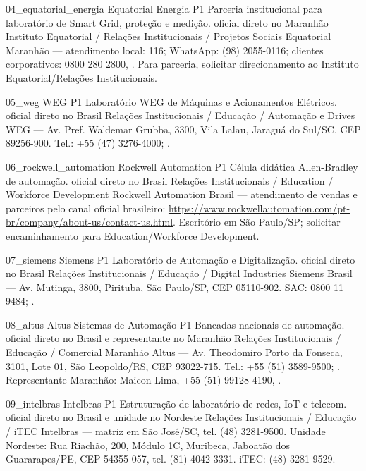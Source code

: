 \ContatoEmpresa
  {04_equatorial_energia}
  {Equatorial Energia}
  {P1}
  {Parceria institucional para laboratório de Smart Grid, proteção e medição.}
  {oficial direto no Maranhão}
  {Instituto Equatorial / Relações Institucionais / Projetos Sociais}
  {Equatorial Maranhão — atendimento local: 116; WhatsApp: (98) 2055-0116; clientes corporativos: 0800 280 2800, . Para parceria, solicitar direcionamento ao Instituto Equatorial/Relações Institucionais.}

\ContatoEmpresa
  {05_weg}
  {WEG}
  {P1}
  {Laboratório WEG de Máquinas e Acionamentos Elétricos.}
  {oficial direto no Brasil}
  {Relações Institucionais / Educação / Automação e Drives}
  {WEG — Av. Pref. Waldemar Grubba, 3300, Vila Lalau, Jaraguá do Sul/SC, CEP 89256-900. Tel.: +55 (47) 3276-4000; .}

\ContatoEmpresa
  {06_rockwell_automation}
  {Rockwell Automation}
  {P1}
  {Célula didática Allen-Bradley de automação.}
  {oficial direto no Brasil}
  {Relações Institucionais / Education / Workforce Development}
  {Rockwell Automation Brasil — atendimento de vendas e parceiros pelo canal oficial brasileiro: \url{https://www.rockwellautomation.com/pt-br/company/about-us/contact-us.html}. Escritório em São Paulo/SP; solicitar encaminhamento para Education/Workforce Development.}

\ContatoEmpresa
  {07_siemens}
  {Siemens}
  {P1}
  {Laboratório de Automação e Digitalização.}
  {oficial direto no Brasil}
  {Relações Institucionais / Educação / Digital Industries}
  {Siemens Brasil — Av. Mutinga, 3800, Pirituba, São Paulo/SP, CEP 05110-902. SAC: 0800 11 9484; .}

\ContatoEmpresa
  {08_altus}
  {Altus Sistemas de Automação}
  {P1}
  {Bancadas nacionais de automação.}
  {oficial direto no Brasil e representante no Maranhão}
  {Relações Institucionais / Educação / Comercial Maranhão}
  {Altus — Av. Theodomiro Porto da Fonseca, 3101, Lote 01, São Leopoldo/RS, CEP 93022-715. Tel.: +55 (51) 3589-9500; . Representante Maranhão: Maicon Lima, +55 (51) 99128-4190, .}

\ContatoEmpresa
  {09_intelbras}
  {Intelbras}
  {P1}
  {Estruturação de laboratório de redes, IoT e telecom.}
  {oficial direto no Brasil e unidade no Nordeste}
  {Relações Institucionais / Educação / iTEC}
  {Intelbras — matriz em São José/SC, tel. (48) 3281-9500. Unidade Nordeste: Rua Riachão, 200, Módulo 1C, Muribeca, Jaboatão dos Guararapes/PE, CEP 54355-057, tel. (81) 4042-3331. iTEC: (48) 3281-9529.}

